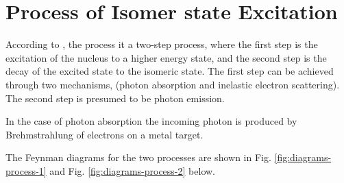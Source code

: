 \chapter{Process of Isomer state Excitation}

According to \cite{jacob_enhanced_2025}, the process it a two-step process, where the first step is the excitation of the nucleus to a higher energy state, and the second step is the decay of the excited state to the isomeric state. The first step can be achieved through two  mechanisms, (photon absorption and inelastic electron scattering). The second step is presumed to be photon emission.

In the case of photon absorption the incoming photon is produced by Brehmstrahlung of electrons on a metal target.

The Feynman diagrams for the two processes are shown in Fig. \ref{fig:diagrams-process-1} and Fig. \ref{fig:diagrams-process-2} below.


